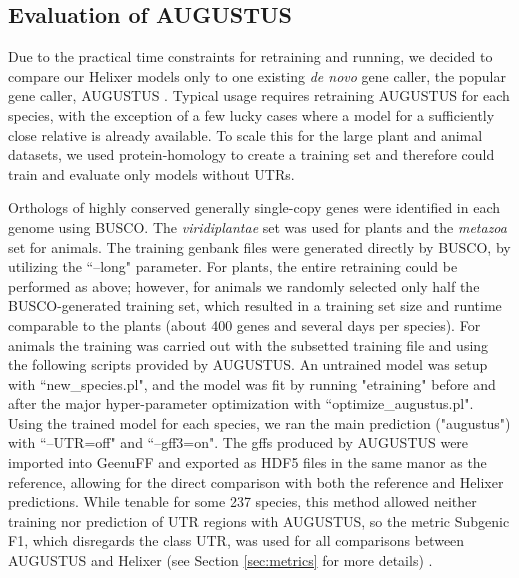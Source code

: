 \documentclass{bioinfo}
\begin{document}
\begin{methods}
\subsection{Evaluation of AUGUSTUS} 
\label{sec:augustus}
Due to the practical time constraints for retraining and running, we decided to compare our Helixer
models only to one existing {\it de novo} gene caller, the popular gene caller, AUGUSTUS \citep{stanke2003gene}.
Typical usage requires retraining AUGUSTUS for each species, with the exception of a
few lucky cases where a model for a sufficiently close relative is already available. To scale this for 
the large plant and animal datasets, we used protein-homology to create a training set and
therefore could train and evaluate only models without UTRs. 

Orthologs of highly conserved generally single-copy genes were identified in each genome using
BUSCO. The {\it viridiplantae} set was used for plants and the {\it metazoa} set for animals.
The training genbank files were generated directly by BUSCO, by utilizing the ``--long"  %
parameter. For plants, the entire retraining could be performed as above; however, for animals
we randomly selected only half the BUSCO-generated training set, which resulted in a training set 
size and runtime comparable to the plants (about 400 genes and several days per species). For animals
the training was carried out with the subsetted training file and using the following scripts provided
by AUGUSTUS. An untrained model was setup with ``new\_species.pl", and the model was fit by running
"etraining" before and after the major hyper-parameter optimization with ``optimize\_augustus.pl".
Using the trained model for each species, we ran the main prediction ("augustus") with ``--UTR=off"
and ``--gff3=on". The gffs produced by AUGUSTUS were imported into GeenuFF and exported as HDF5
files in the same manor as the reference, allowing for the direct comparison with both the reference and 
Helixer predictions. While tenable for some 237 species, this method allowed neither training
nor prediction of UTR regions with AUGUSTUS, so the metric Subgenic F1, which disregards the class UTR,
was used for all comparisons between AUGUSTUS and Helixer (see Section \ref{sec:metrics} for more details) .


\end{methods}
\end{document}
